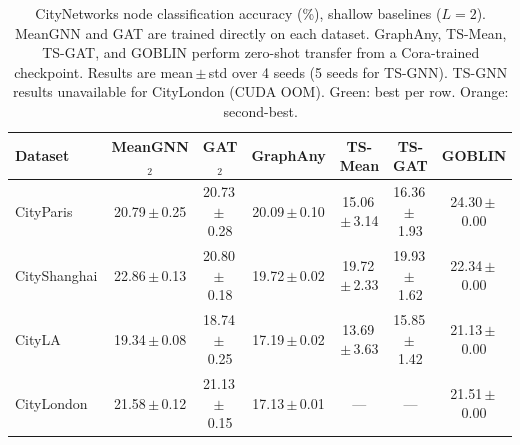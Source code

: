 %
\newcommand{\res}[2]{#1{\small\,$\pm$\,#2}}
\newcommand{\best}[2]{\textcolor{green!60!black}{\res{#1}{#2}}}
\newcommand{\second}[2]{\textcolor{orange!85!black}{\res{#1}{#2}}}


\begin{table}[t]
\caption{CityNetworks node classification accuracy (\%), shallow baselines ($L=2$).
MeanGNN and GAT are trained directly on each dataset.
GraphAny, TS-Mean, TS-GAT, and GOBLIN perform zero-shot transfer from a Cora-trained checkpoint.
Results are mean\,$\pm$\,std over 4 seeds (5 seeds for TS-GNN).
TS-GNN results unavailable for CityLondon (CUDA OOM).
\textcolor{green!60!black}{Green}: best per row. \textcolor{orange!85!black}{Orange}: second-best.}
\label{tab:city_shallow}
\centering
\begin{tabular}{lcccccc}
\toprule
Dataset
  & MeanGNN$_{2}$
  & GAT$_{2}$
  & GraphAny
  & TS-Mean
  & TS-GAT
  & GOBLIN \\
\midrule
CityParis
  & \second{20.79}{0.25}
  & \res{20.73}{0.28}
  & \res{20.09}{0.10}
  & \res{15.06}{3.14}
  & \res{16.36}{1.93}
  & \best{24.30}{0.00} \\
CityShanghai
  & \best{22.86}{0.13}
  & \res{20.80}{0.18}
  & \res{19.72}{0.02}
  & \res{19.72}{2.33}
  & \res{19.93}{1.62}
  & \second{22.34}{0.00} \\
CityLA
  & \second{19.34}{0.08}
  & \res{18.74}{0.25}
  & \res{17.19}{0.02}
  & \res{13.69}{3.63}
  & \res{15.85}{1.42}
  & \best{21.13}{0.00} \\
CityLondon
  & \best{21.58}{0.12}
  & \res{21.13}{0.15}
  & \res{17.13}{0.01}
  & ---
  & ---
  & \second{21.51}{0.00} \\
\bottomrule
\end{tabular}
\end{table}



